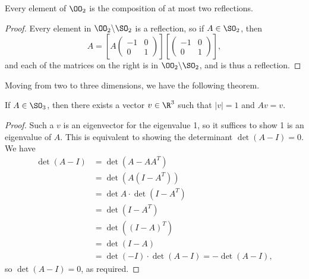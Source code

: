 \documentclass[a4]{scrreprt}
\begin{document}
\begin{corollary}
	Every element of $\OO_2$ is the composition of at most two reflections.
\end{corollary}
\begin{proof}
	Every element in $\OO_2 \backslash \SO_2$ is a reflection, so if $A \in \SO_2$, then
	$$
	A =\left[ A \begin{pmatrix}
		-1 & 0 \\ 0 & 1
	\end{pmatrix}\right]\left[\begin{pmatrix}
		-1 & 0 \\ 0 & 1
	\end{pmatrix}\right],
	$$
	and each of the matrices on the right is in $\OO_2 \backslash \SO_2$, and is thus a reflection.
\end{proof}

Moving from two to three dimensions, we have the following theorem.
\begin{theorem}
	If $A \in \SO_3$, then there exists a vector $v \in \R^3$ such that $|v| = 1$ and $Av = v$.
\end{theorem}
\begin{proof}
	Such a $v$ is an eigenvector for the eigenvalue 1, so it suffices to show 1 is an eigenvalue of $A$. This is equivalent to showing the determinant $\det(A - I) = 0$. We have
	{\allowdisplaybreaks
	\begin{align*}
\det(A - I) &= \det(A - AA^T) \\
			&= \det(A(I - A^T)) \\
			&= \det A \cdot \det (I - A^T) \\
			&= \det(I - A^T)\\
			&= \det((I - A)^T)\\
			&= \det(I - A) \\
			&= \det(-I) \cdot \det(A - I) = -\det(A - I),
	\end{align*}}
	so $\det(A - I) = 0$, as required.
\end{proof}
\end{document}
